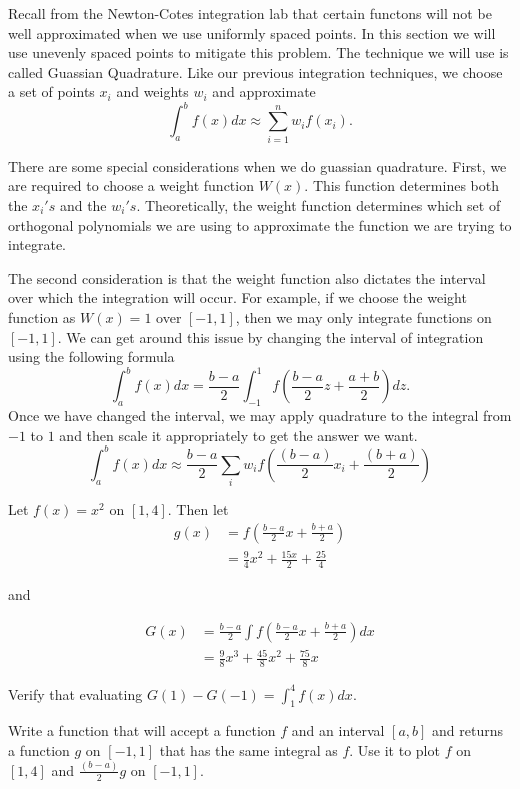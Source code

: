 \label{Lab:GaussQuad}

Recall from the Newton-Cotes integration lab that certain functons will not be well approximated when we use uniformly spaced points.
In this section we will use unevenly spaced points to mitigate this problem.
The technique we will use is called Guassian Quadrature.
Like our previous integration techniques, we choose a set of points $x_i$ and weights $w_i$ and approximate
\[
\int_{a}^b f(x) dx \approx \sum_{i=1}^n w_if(x_i).
\]

There are some special considerations when we do guassian quadrature.
First, we are required to choose a weight function $W(x)$.
This function determines both the $x_i's$ and the $w_i's$.
Theoretically, the weight function determines which set of orthogonal polynomials we are using to approximate the function we are trying to integrate.

The second consideration is that the weight function also dictates the interval over which the integration will occur.
For example, if we choose the weight function as $W(x) = 1$ over $[-1,1]$, then we may only integrate functions on $[-1,1]$.
We can get around this issue by changing the interval of integration using the following formula
\[
\int_a^b f(x) dx = \frac{b-a}{2}\int_{-1}^1 f(\frac{b-a}{2}z + \frac{a+b}{2})dz.
\]
Once we have changed the interval, we may apply quadrature to the integral from $-1$ to $1$ and then scale it appropriately to get the answer we want.
\[
\int_a^b f(x) dx \approx \frac{b - a}{2} \sum_i w_if(\frac{(b-a)}{2}x_i + \frac{(b+a)}{2})
\]

\begin{problem}
Let $f(x) = x^2$ on $[1,4]$.  Then let
\begin{align*}
g(x) &= f(\frac{b-a}{2}x + \frac{b+a}{2}) \\
&= \frac{9}{4} x^2 + \frac{15 x}{2} + \frac{25}{4}
\end{align*}

and

\begin{align*}
G(x) &= \frac{b - a}{2} \int f(\frac{b - a}{2} x + \frac{b + a}{2})dx \\
&= \frac{9}{8} x^3 + \frac{45}{8} x^2 + \frac{75}{8} x
\end{align*}

Verify that evaluating $G(1) - G(-1) = \int_1^4 f(x)dx$.

Write a function that will accept a function $f$ and an interval $[a,b]$ and returns a function $g$ on $[-1,1]$ that has the same integral as $f$.
Use it to plot $f$ on $[1, 4]$ and $\frac{\left(b - a\right)}{2}g$ on $[-1,1]$.
\end{problem}

